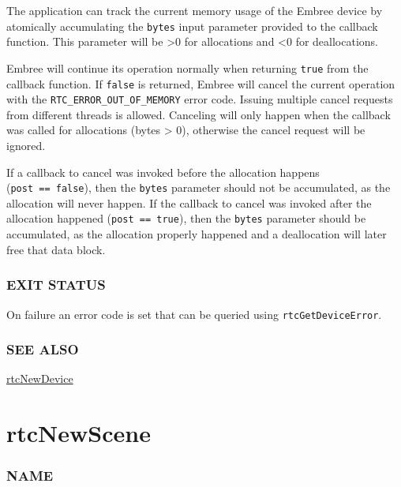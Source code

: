 The application can track the current memory usage of the Embree device
by atomically accumulating the \texttt{bytes} input parameter provided
to the callback function. This parameter will be \textgreater0 for
allocations and \textless0 for deallocations.

Embree will continue its operation normally when returning \texttt{true}
from the callback function. If \texttt{false} is returned, Embree will
cancel the current operation with the
\texttt{RTC\_ERROR\_OUT\_OF\_MEMORY} error code. Issuing multiple cancel
requests from different threads is allowed. Canceling will only happen
when the callback was called for allocations (bytes \textgreater{} 0),
otherwise the cancel request will be ignored.

If a callback to cancel was invoked before the allocation happens
(\texttt{post\ ==\ false}), then the \texttt{bytes} parameter should not
be accumulated, as the allocation will never happen. If the callback to
cancel was invoked after the allocation happened
(\texttt{post\ ==\ true}), then the \texttt{bytes} parameter should be
accumulated, as the allocation properly happened and a deallocation will
later free that data block.

\subsubsection{EXIT STATUS}\label{exit-status}

On failure an error code is set that can be queried using
\texttt{rtcGetDeviceError}.

\subsubsection{SEE ALSO}\label{see-also}

\hyperref[rtcnewdevice]{rtcNewDevice}

\pagebreak

\section{rtcNewScene}\label{rtcnewscene}

\subsubsection{NAME}\label{name}

\begin{Shaded}
\begin{Highlighting}[]
\OperatorTok{{-}}
\end{Highlighting}
\end{Shaded}

